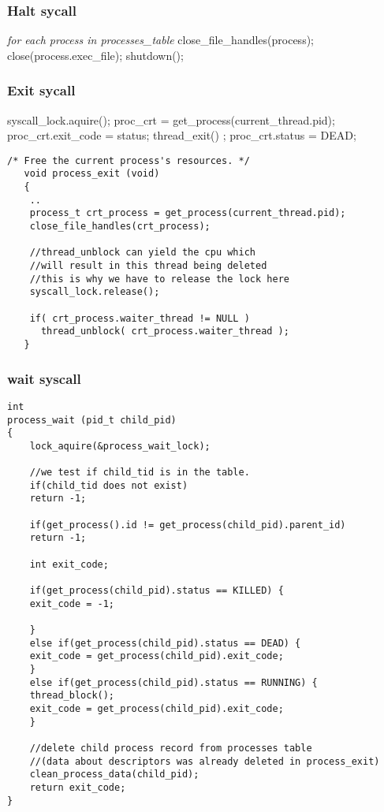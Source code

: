     \subsubsection{Halt sycall}
    \vspace{-3em} %
      \begin{program}
	\textit{for each process in processes\_table}
	\hspace{30pt}close\_file\_handles(process);
	\hspace{30pt}close(process.exec\_file);
	shutdown();
      \end{program}


    \subsubsection{Exit sycall}
    \vspace{-3em} %
      \begin{program}
	syscall\_lock.aquire();
	proc\_crt = get\_process(current\_thread.pid);
	proc\_crt.exit\_code = status;
	thread\_exit() ;
	proc\_crt.status = DEAD;
      \end{program}
    \begin{lstlisting}
/* Free the current process's resources. */	
   void process_exit (void)
   {
    ..
    process_t crt_process = get_process(current_thread.pid);
    close_file_handles(crt_process);
    
    //thread_unblock can yield the cpu which
    //will result in this thread being deleted
    //this is why we have to release the lock here
    syscall_lock.release();
    
    if( crt_process.waiter_thread != NULL ) 
      thread_unblock( crt_process.waiter_thread );
   }
    \end{lstlisting}


    \subsubsection{wait syscall}
    \vspace{-1em} %
    \begin{lstlisting}
int
process_wait (pid_t child_pid) 
{
    lock_aquire(&process_wait_lock);
    
    //we test if child_tid is in the table.
    if(child_tid does not exist) 
	return -1;

    if(get_process().id != get_process(child_pid).parent_id)
	return -1;

    int exit_code;

    if(get_process(child_pid).status == KILLED) {
	exit_code = -1;
	
    }
    else if(get_process(child_pid).status == DEAD) {
	exit_code = get_process(child_pid).exit_code;            
    }
    else if(get_process(child_pid).status == RUNNING) {
	thread_block(); 
	exit_code = get_process(child_pid).exit_code;
    }

    //delete child process record from processes table 
    //(data about descriptors was already deleted in process_exit)
    clean_process_data(child_pid);
    return exit_code;
}
    \end{lstlisting}


